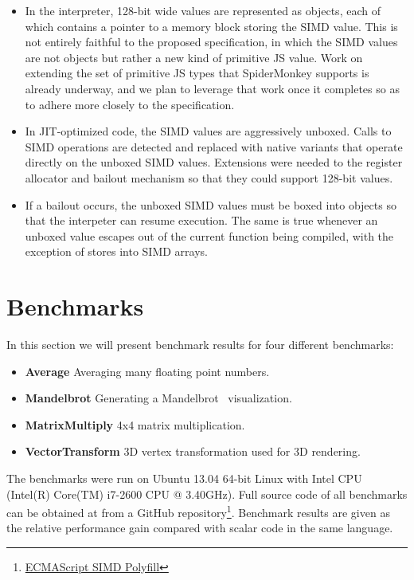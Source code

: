 \documentclass[preprint]{sigplanconf}
\begin{document}
\begin{itemize}
\item
In the interpreter, 128-bit wide values are represented as objects,
each of which contains a pointer to a memory block storing the SIMD
value. This is not entirely faithful to the proposed specification, in
which the SIMD values are not objects but rather a new kind of
primitive JS value. Work on extending the set of primitive JS types
that SpiderMonkey supports is already underway, and we plan to
leverage that work once it completes so as to adhere more closely to
the specification.

\item
In JIT-optimized code, the SIMD values are aggressively unboxed. Calls
to SIMD operations are detected and replaced with native variants that
operate directly on the unboxed SIMD values. Extensions were needed to
the register allocator and bailout mechanism so that they could
support 128-bit values.

\item 
If a bailout occurs, the unboxed SIMD values must be boxed into
objects so that the interpeter can resume execution. The same is true
whenever an unboxed value escapes out of the current function being
compiled, with the exception of stores into SIMD arrays.

\end{itemize}

\section{Benchmarks}

In this section we will present benchmark results for four different benchmarks:

\begin{itemize}

\item
\textbf{Average} Averaging many floating point numbers.

\item
\textbf{Mandelbrot} Generating a Mandelbrot~\cite{mandelbrot} visualization.

\item
\textbf{MatrixMultiply} 4x4 matrix multiplication.

\item
\textbf{VectorTransform} 3D vertex transformation used for 3D rendering.
\end{itemize}

The benchmarks were run on Ubuntu 13.04 64-bit Linux with Intel CPU (Intel(R)
Core(TM) i7-2600 CPU @ 3.40GHz). Full source code of all benchmarks can be
obtained at from a GitHub repository\footnote{\href{https://github.com/johnmccut
chan/ecmascript_simd/}{ECMAScript SIMD Polyfill}}. Benchmark results are given
as the relative performance gain compared with scalar code in the same language.
\end{document}
